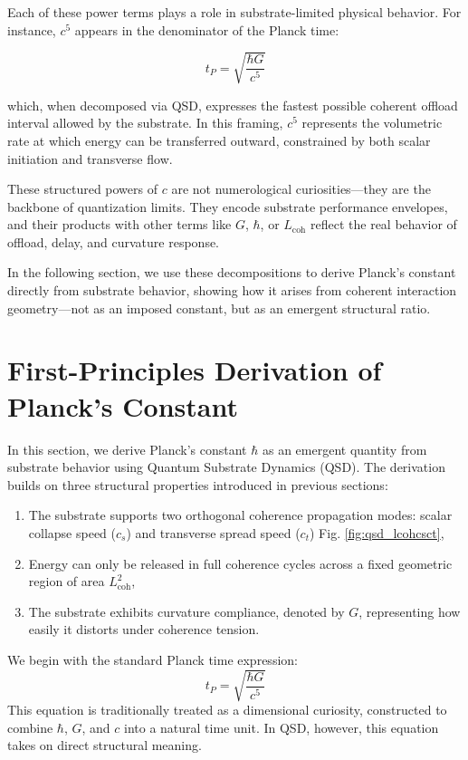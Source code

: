 \documentclass[ht-mathphys]{ht-fmt}
\theoremstyle{thmstyleone}%
\theoremstyle{thmstyletwo}%
\theoremstyle{thmstylethree}%
\begin{document}
Each of these power terms plays a role in substrate-limited physical behavior. For instance, $c^5$ appears in the denominator of the Planck time:

\[
t_P = \sqrt{\frac{\hbar G}{c^5}}
\]

which, when decomposed via QSD, expresses the fastest possible coherent offload interval allowed by the substrate. In this framing, $c^5$ represents the volumetric rate at which energy can be transferred outward, constrained by both scalar initiation and transverse flow.

These structured powers of $c$ are not numerological curiosities—they are the backbone of quantization limits. They encode substrate performance envelopes, and their products with other terms like $G$, $\hbar$, or $L_{\text{coh}}$ reflect the real behavior of offload, delay, and curvature response.

In the following section, we use these decompositions to derive Planck’s constant directly from substrate behavior, showing how it arises from coherent interaction geometry—not as an imposed constant, but as an emergent structural ratio.

\section{First-Principles Derivation of Planck’s Constant}

In this section, we derive Planck’s constant $\hbar$ as an emergent quantity from substrate behavior using Quantum Substrate Dynamics (QSD). The derivation builds on three structural properties introduced in previous sections:

\begin{enumerate}
    \item The substrate supports two orthogonal coherence propagation modes: scalar collapse speed ($c_s$) and transverse spread speed ($c_t$) Fig. \ref{fig:qsd_lcohcsct},
    \item Energy can only be released in full coherence cycles across a fixed geometric region of area $L_{\text{coh}}^2$,
    \item The substrate exhibits curvature compliance, denoted by $G$, representing how easily it distorts under coherence tension.
\end{enumerate}

We begin with the standard Planck time expression:
\[
t_P = \sqrt{\frac{\hbar G}{c^5}}
\]
This equation is traditionally treated as a dimensional curiosity, constructed to combine $\hbar$, $G$, and $c$ into a natural time unit. In QSD, however, this equation takes on direct structural meaning.
\end{document}
